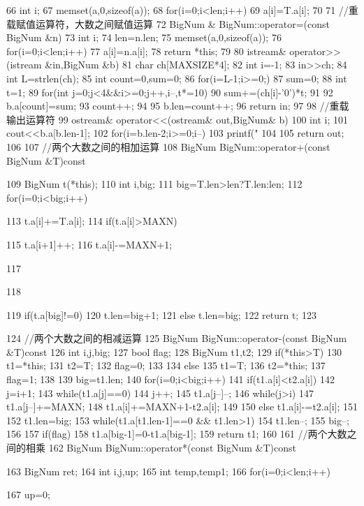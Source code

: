 \documentclass[11pt]{article}
\begin{document}
\begin{Code}
{ 66       int i;
 67       memset(a,0,sizeof(a));
 68       for(i=0;i<len;i++)
 69           a[i]=T.a[i];
 70   }
 71   //重载赋值运算符，大数之间赋值运算
 72   BigNum & BigNum::operator=(const BigNum &n){
 73       int i;
 74       len=n.len;
 75       memset(a,0,sizeof(a));
 76       for(i=0;i<len;i++)
 77           a[i]=n.a[i];
 78       return *this;
 79   }
 80   istream& operator>>(istream &in,BigNum &b){
 81       char ch[MAXSIZE*4];
 82       int i=-1;
 83       in>>ch;
 84       int L=strlen(ch);
 85       int count=0,sum=0;
 86       for(i=L-1;i>=0;){
 87           sum=0;
 88           int t=1;
 89           for(int j=0;j<4&&i>=0;j++,i--,t*=10){
 90               sum+=(ch[i]-'0')*t;
 91           }
 92           b.a[count]=sum;
 93           count++;
 94       }
 95       b.len=count++;
 96       return in;
 97   }
 98   //重载输出运算符
 99   ostream& operator<<(ostream& out,BigNum& b){
100       int i;
101       cout<<b.a[b.len-1];
102       for(i=b.len-2;i>=0;i--){
103           printf("%
104       }
105       return out;
106   }
107   //两个大数之间的相加运算
108   BigNum BigNum::operator+(const BigNum &T)const{
109       BigNum t(*this);
110       int i,big;
111       big=T.len>len?T.len:len;
112       for(i=0;i<big;i++){
113           t.a[i]+=T.a[i];
114           if(t.a[i]>MAXN){
115               t.a[i+1]++;
116               t.a[i]-=MAXN+1;


117           }
118       }
119       if(t.a[big]!=0)
120          t.len=big+1;
121       else t.len=big;
122       return t;
123   }
124   //两个大数之间的相减运算
125   BigNum BigNum::operator-(const BigNum &T)const{
126       int i,j,big;
127       bool flag;
128       BigNum t1,t2;
129       if(*this>T){
130           t1=*this;
131           t2=T;
132           flag=0;
133       }
134       else{
135           t1=T;
136           t2=*this;
137           flag=1;
138       }
139       big=t1.len;
140       for(i=0;i<big;i++){
141           if(t1.a[i]<t2.a[i]){
142                j=i+1;
143                while(t1.a[j]==0)
144                    j++;
145                t1.a[j--]--;
146                while(j>i)
147                    t1.a[j--]+=MAXN;
148                t1.a[i]+=MAXN+1-t2.a[i];
149           }
150           else t1.a[i]-=t2.a[i];
151       }
152       t1.len=big;
153       while(t1.a[t1.len-1]==0 && t1.len>1){
154           t1.len--;
155           big--;
156       }
157       if(flag)
158           t1.a[big-1]=0-t1.a[big-1];
159       return t1;
160   }
161   //两个大数之间的相乘
162   BigNum BigNum::operator*(const BigNum &T)const{
163       BigNum ret;
164       int i,j,up;
165       int temp,temp1;
166       for(i=0;i<len;i++){
167           up=0;


}}
\end{Code}
\end{document}
